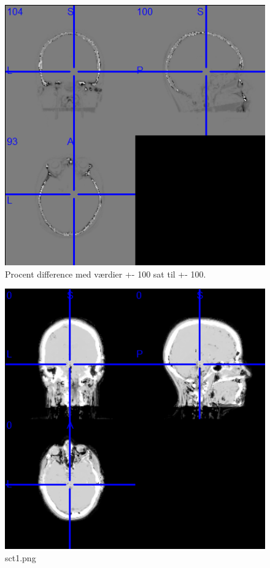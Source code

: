 \begin{figure}
\includegraphics[width=\linewidth]{pdsct0.png}
\caption{Procent difference med værdier +- 100 sat til +- 100.}
\end{figure}

\begin{figure}
\includegraphics[width=\linewidth]{sct1.png}
\caption{sct1.png}
\end{figure}

